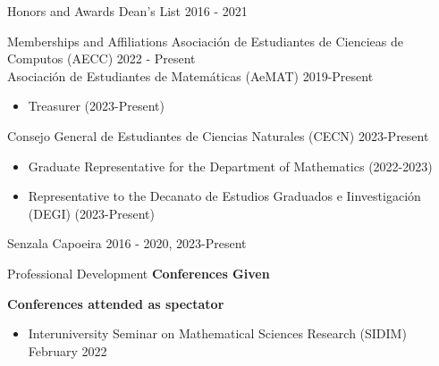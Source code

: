 \documentclass{resume} %
\begin{document}
\begin{rSection}{Honors and Awards}
    Dean's List \hfill{2016 - 2021}
\end{rSection}

\begin{rSection}{Memberships and Affiliations}
    Asociaci\'on de Estudiantes de Ciencieas de Computos (AECC) \hfill{2022 - Present} \\
    Asociaci\'on de Estudiantes de Matem\'aticas (AeMAT) \hfill{2019-Present}
        \begin{itemize}
            \item Treasurer (2023-Present)
        \end{itemize}
    Consejo General de Estudiantes de Ciencias Naturales (CECN) {2023-Present}
        \begin{itemize}
            \item Graduate Representative for the Department of Mathematics
                (2022-2023)

            \item Representative to the Decanato de Estudios Graduados e
                Iinvestigaci\'on (DEGI)
                (2023-Present)
        \end{itemize}
    Senzala Capoeira \hfill{2016 - 2020, 2023-Present} \\
\end{rSection}


\begin{rSection}{Professional Development}
    \textbf{Conferences Given}
    \textbf{Conferences attended as spectator}
    \begin{itemize}
        \item Interuniversity Seminar on Mathematical Sciences Research (SIDIM)
        \hfill{February 2022}
    \end{itemize}

\end{rSection}
\end{document}
